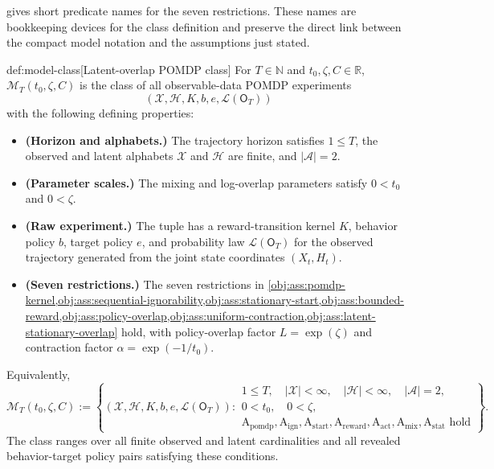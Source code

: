  gives short predicate names for the seven restrictions. These names are bookkeeping devices for the class definition and preserve the direct link between the compact model notation and the assumptions just stated.

\begin{definitionv}{def:model-class}[Latent-overlap POMDP class]
For \(T\in\mathbb N\) and \(t_0,\zeta,C\in\mathbb R\), \(\mathcal M_T(t_0,\zeta,C)\) is the class of all observable-data POMDP experiments
\[
(\mathcal X,\mathcal H,K,b,e,\mathcal L(\mathsf O_T))
\]
with the following defining properties:
\begin{itemize}
\item \textbf{(Horizon and alphabets.)} The trajectory horizon satisfies \(1\le T\), the observed and latent alphabets \(\mathcal X\) and \(\mathcal H\) are finite, and \(|\mathcal A|=2\).
\item \textbf{(Parameter scales.)} The mixing and log-overlap parameters satisfy \(0<t_0\) and \(0<\zeta\).
\item \textbf{(Raw experiment.)} The tuple has a reward-transition kernel \(K\), behavior policy \(b\), target policy \(e\), and probability law \(\mathcal L(\mathsf O_T)\) for the observed trajectory generated from the joint state coordinates \((X_t,H_t)\).
\item \textbf{(Seven restrictions.)} The seven restrictions in \cref{obj:ass:pomdp-kernel,obj:ass:sequential-ignorability,obj:ass:stationary-start,obj:ass:bounded-reward,obj:ass:policy-overlap,obj:ass:uniform-contraction,obj:ass:latent-stationary-overlap} hold, with policy-overlap factor \(L=\exp(\zeta)\) and contraction factor \(\alpha=\exp(-1/t_0)\).
\end{itemize}
Equivalently,
\[
\mathcal M_T(t_0,\zeta,C)
:=
\left\{
(\mathcal X,\mathcal H,K,b,e,\mathcal L(\mathsf O_T)):
\begin{array}{l}
1\le T,\quad |\mathcal X|<\infty,\quad |\mathcal H|<\infty,\quad |\mathcal A|=2,\\
0<t_0,\quad 0<\zeta,\\
\mathrm A_{\mathrm{pomdp}},\mathrm A_{\mathrm{ign}},\mathrm A_{\mathrm{start}},
\mathrm A_{\mathrm{reward}},\mathrm A_{\mathrm{act}},
\mathrm A_{\mathrm{mix}},\mathrm A_{\mathrm{stat}}\text{ hold}
\end{array}
\right\}.
\]
The class ranges over all finite observed and latent cardinalities and all revealed behavior-target policy pairs satisfying these conditions.
\end{definitionv}

